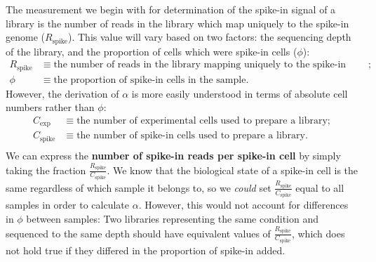 The measurement we begin with for determination of the spike-in signal of a library is the number of reads in the library which map uniquely to the spike-in genome ($R_{\text{spike}}$).
This value will vary based on two factors: the sequencing depth of the library, and the proportion of cells which were spike-in cells ($\phi$):
\begin{align*}
    R_{\text{spike}} &\equiv \text{the number of reads in the library mapping uniquely to the spike-in genome}; \\
    \phi &\equiv \text{the proportion of spike-in cells in the sample}.
\end{align*}
However, the derivation of $\alpha$ is more easily understood in terms of absolute cell numbers rather than $\phi$:
\begin{align*}
    C_{\text{exp}} &\equiv \text{the number of experimental cells used to prepare a library}; \\
    C_{\text{spike}} &\equiv \text{the number of spike-in cells used to prepare a library}. \\
\end{align*}
We can express the \textbf{number of spike-in reads per spike-in cell} by simply taking the fraction $\frac{R_{\text{spike}}}{C_{\text{spike}}}$.
We know that the biological state of a spike-in cell is the same regardless of which sample it belongs to, so we \textit{could} set $\frac{R_{\text{spike}}}{C_{\text{spike}}}$ equal to all samples in order to calculate $\alpha$.
However, this would not account for differences in $\phi$ between samples: Two libraries representing the same condition and sequenced to the same depth should have equivalent values of $\frac{R_{\text{spike}}}{C_{\text{spike}}}$, which does not hold true if they differed in the proportion of spike-in added.

